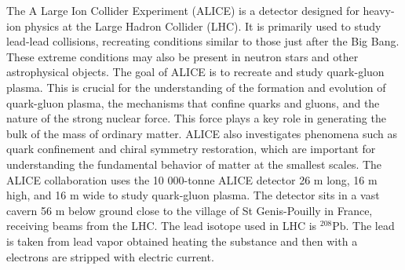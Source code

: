 \documentclass[12pt,a4paper]{book}
\begin{document}
	The A Large Ion Collider Experiment (ALICE) is a detector designed for heavy-ion physics at the Large Hadron Collider (LHC). It is primarily used to study lead-lead collisions, recreating conditions similar to those just after the Big Bang. These extreme conditions may also be present in neutron stars and other astrophysical objects. The goal of ALICE is to recreate and study quark-gluon plasma. This is crucial for the understanding of the formation and evolution of quark-gluon plasma, the mechanisms that confine quarks and gluons, and the nature of the strong nuclear force. This force plays a key role in generating the bulk of the mass of ordinary matter. ALICE also investigates phenomena such as quark confinement and chiral symmetry restoration, which are important for understanding the fundamental behavior of matter at the smallest scales.
   	The ALICE collaboration uses the 10 000-tonne ALICE detector 26 m long, 16 m high, and 16 m wide to study quark-gluon plasma. The detector sits in a vast cavern 56 m below ground close to the village of St Genis-Pouilly in France, receiving beams from the LHC. \cite{Alice}
    The lead isotope used in LHC is  $^{208}\text{Pb}$. The lead is taken from lead vapor obtained heating the substance and then with a electrons are stripped with electric current.
    
\end{document}

